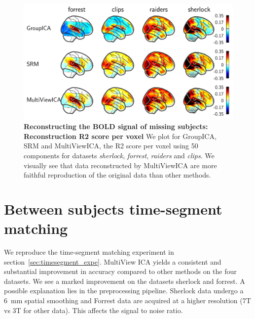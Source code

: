 \begin{figure}
  \centering
  \includegraphics[width=\textwidth]{figures/mvica/reconstruction_score_fullbrain.pdf}
  \caption{\textbf{Reconstructing the BOLD signal of missing subjects: Reconstruction R2 score per voxel} We plot for GroupICA, SRM and MultiViewICA, the R2 score per voxel using 50 components for datasets \emph{sherlock}, \emph{forrest}, \emph{raiders} and \emph{clips}. We visually see that data reconstructed by MultiViewICA are more faithful reproduction of the original data than other methods.}
  \label{fig:brainmaps}
\end{figure}



\section{Between subjects time-segment matching} 
We reproduce the time-segment matching experiment in
section~\ref{sec:timesegment_expe}. 
MultiView ICA yields a consistent and substantial improvement in accuracy compared to other methods on the four datasets. We see a marked improvement on the datasets sherlock and forrest. A possible explanation lies in the preprocessing pipeline. Sherlock data undergo a 6~mm spatial smoothing and Forrest data are acquired at a higher resolution (7T vs 3T for other data). This affects the signal to noise ratio.
%

